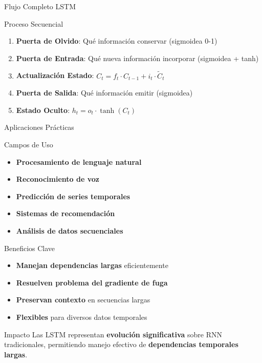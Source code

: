 \documentclass[
  ignorenonframetext,
]{beamer}
\providecommand{\tightlist}{%
  \setlength{\itemsep}{0pt}\setlength{\parskip}{0pt}}
\begin{document}
\begin{frame}{Flujo Completo LSTM}
\label{flujo-completo-lstm}
\begin{block}{Proceso Secuencial}
\label{proceso-secuencial}
\begin{enumerate}
\tightlist
\item
  \textbf{Puerta de Olvido}: Qué información conservar (sigmoidea 0-1)
\item
  \textbf{Puerta de Entrada}: Qué nueva información incorporar
  (sigmoidea + tanh)
\item
  \textbf{Actualización Estado}:
  \(C_t = f_t \cdot C_{t-1} + i_t \cdot \tilde{C}_t\)
\item
  \textbf{Puerta de Salida}: Qué información emitir (sigmoidea)
\item
  \textbf{Estado Oculto}: \(h_t = o_t \cdot \tanh(C_t)\)
\end{enumerate}
\end{block}
\end{frame}

\begin{frame}{Aplicaciones Prácticas}
\label{aplicaciones-pruxe1cticas}
\begin{block}{Campos de Uso}
\label{campos-de-uso}
\begin{itemize}
\tightlist
\item
  \textbf{Procesamiento de lenguaje natural}
\item
  \textbf{Reconocimiento de voz}
\item
  \textbf{Predicción de series temporales}
\item
  \textbf{Sistemas de recomendación}
\item
  \textbf{Análisis de datos secuenciales}
\end{itemize}
\end{block}

\begin{block}{Beneficios Clave}
\label{beneficios-clave}
\begin{itemize}
\tightlist
\item
  \textbf{Manejan dependencias largas} eficientemente
\item
  \textbf{Resuelven problema del gradiente de fuga}
\item
  \textbf{Preservan contexto} en secuencias largas
\item
  \textbf{Flexibles} para diversos datos temporales
\end{itemize}
\end{block}

\begin{block}{Impacto}
\label{impacto}
Las LSTM representan \textbf{evolución significativa} sobre RNN
tradicionales, permitiendo manejo efectivo de \textbf{dependencias
temporales largas}.
\end{block}
\end{frame}
\end{document}
